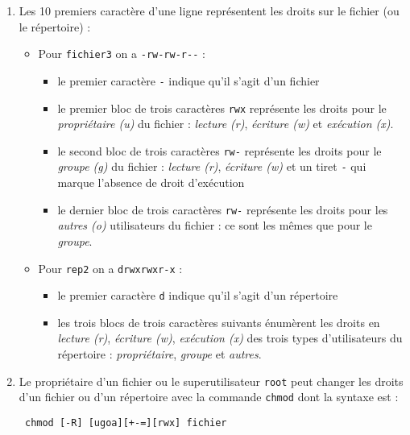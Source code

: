 \documentclass[
  11pt,
]{article}
\providecommand{\tightlist}{%
  \setlength{\itemsep}{0pt}\setlength{\parskip}{0pt}}
\newcounter{prop}
\newcounter{rque}
\newcounter{def}
\begin{document}
\begin{enumerate}
\def\labelenumi{\arabic{enumi}.}
\item
  Les 10 premiers caractère d'une ligne représentent les droits sur le
  fichier (ou le répertoire) :

  \begin{itemize}
  \tightlist
  \item
    Pour \texttt{fichier3} on a \texttt{-rw-rw-r-\/-} :

    \begin{itemize}
    \tightlist
    \item
      le premier caractère \texttt{-} indique qu'il s'agit d'un fichier
    \item
      le premier bloc de trois caractères \texttt{rwx} représente les
      droits pour le \emph{propriétaire (u)} du fichier : \emph{lecture
      (r)}, \emph{écriture (w)} et \emph{exécution (x)}.
    \item
      le second bloc de trois caractères \texttt{rw-} représente les
      droits pour le \emph{groupe (g)} du fichier : \emph{lecture (r)},
      \emph{écriture (w)} et un tiret \texttt{-} qui marque l'absence de
      droit d'exécution
    \item
      le dernier bloc de trois caractères \texttt{rw-} représente les
      droits pour les \emph{autres (o)} utilisateurs du fichier : ce
      sont les mêmes que pour le \emph{groupe}.
    \end{itemize}
  \item
    Pour \texttt{rep2} on a \texttt{drwxrwxr-x} :

    \begin{itemize}
    \tightlist
    \item
      le premier caractère \texttt{d} indique qu'il s'agit d'un
      répertoire
    \item
      les trois blocs de trois caractères suivants énumèrent les droits
      en \emph{lecture (r)}, \emph{écriture (w)}, \emph{exécution (x)}
      des trois types d'utilisateurs du répertoire :
      \emph{propriétaire}, \emph{groupe} et \emph{autres}.
    \end{itemize}
  \end{itemize}
\item
  Le propriétaire d'un fichier ou le superutilisateur \texttt{root} peut
  changer les droits d'un fichier ou d'un répertoire avec la commande
  \texttt{chmod} dont la syntaxe est :

\begin{verbatim}
 chmod [-R] [ugoa][+-=][rwx] fichier
\end{verbatim}


\end{enumerate}
\end{document}
